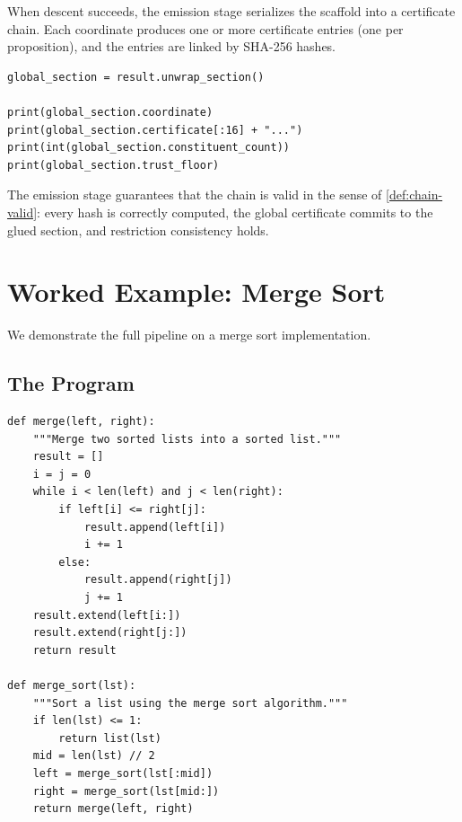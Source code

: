 \documentclass[11pt]{article}
\begin{document}
When descent succeeds, the emission stage serializes the scaffold
into a certificate chain.  Each coordinate produces one or more
certificate entries (one per proposition), and the entries are
linked by SHA-256 hashes.

\begin{lstlisting}[style=jugeo-python,caption={Inspecting the successful global section.}]
global_section = result.unwrap_section()

print(global_section.coordinate)
print(global_section.certificate[:16] + "...")
print(int(global_section.constituent_count))
print(global_section.trust_floor)
\end{lstlisting}

The emission stage guarantees that the chain is valid in the sense
of \cref{def:chain-valid}: every hash is correctly computed, the
global certificate commits to the glued section, and restriction
consistency holds.

\section{Worked Example: Merge Sort}\label{sec:merge-sort}

We demonstrate the full pipeline on a merge sort implementation.

\subsection{The Program}

\begin{lstlisting}[style=jugeo-python,caption={Merge sort in Python.}]
def merge(left, right):
    """Merge two sorted lists into a sorted list."""
    result = []
    i = j = 0
    while i < len(left) and j < len(right):
        if left[i] <= right[j]:
            result.append(left[i])
            i += 1
        else:
            result.append(right[j])
            j += 1
    result.extend(left[i:])
    result.extend(right[j:])
    return result

def merge_sort(lst):
    """Sort a list using the merge sort algorithm."""
    if len(lst) <= 1:
        return list(lst)
    mid = len(lst) // 2
    left = merge_sort(lst[:mid])
    right = merge_sort(lst[mid:])
    return merge(left, right)
\end{lstlisting}
\end{document}
